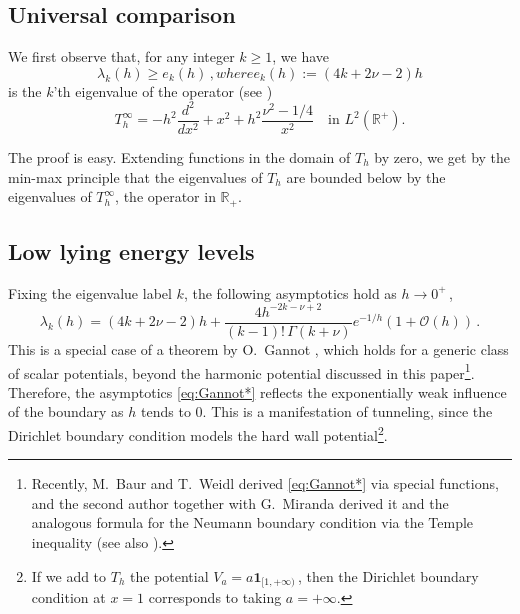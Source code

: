 \documentclass[11pt]{amsart}
\numberwithin{equation}{section}
\theoremstyle{remark}
\newcommand{\R}{\mathbb{R}}
\begin{document}
\subsection{Universal comparison}
We first observe that, for  any integer $k\geq 1$, we have 
\begin{subequations}\label{eq:1.3}
\begin{equation}
\lambda_k(h)\geq e_k(h)\,,
\end{equation}
where 
\begin{equation}
e_k(h):=(4k+2\nu-2)h
\end{equation}
\end{subequations}
is the $k$'th eigenvalue of the operator (see \cite{ESV})
\[ T_h^\infty=- h^2\frac{d^2}{dx^2}+x^2+h^2\frac{\nu^2-1/4}{x^2}\quad \text{in $L^2(\mathbb R^+)$}.\]

The proof is easy. Extending functions in the domain of $T_h$ by zero, we get by the min-max principle that the eigenvalues of $T_h$ are bounded below by the eigenvalues of $T_h^\infty$, the operator in $\R_+$. 

\subsection{Low lying energy levels}
Fixing  the eigenvalue  label $k$, the following asymptotics hold as \(h\to0^+\,\),
\begin{equation}\label{eq:Gannot*}
\lambda_k(h)
=
(4k+2\nu-2)h
+
\frac{4h^{-2k-\nu+2}}
{(k-1)!\,\Gamma(k+\nu)}
e^{-1/h}
\left(1+\mathcal O(h)\right)\,.
\end{equation}
%
This
is a special case of a theorem by 
O.~Gannot \cite{Gannot}, which holds for a generic class of scalar potentials, beyond the harmonic potential  discussed in this paper\footnote{Recently, M.~Baur and T.~Weidl \cite{BaurWeidl} derived \eqref{eq:Gannot*} via special functions, and  the second author together with  G.~Miranda \cite{KM} derived it and the analogous formula for the Neumann boundary condition via the Temple inequality (see also \cite{HL}).}. Therefore, the asymptotics \eqref{eq:Gannot*} reflects the exponentially weak influence of the boundary as $h$ tends to $0$. This is a manifestation of tunneling, since the Dirichlet boundary condition models the hard wall potential\footnote{If we add to $T_h$ the potential $V_a=a\mathbf 1_{[1,+\infty)}\,$, then the Dirichlet boundary condition at $x=1$ corresponds to  taking $a=+\infty$.}. 
\end{document}
